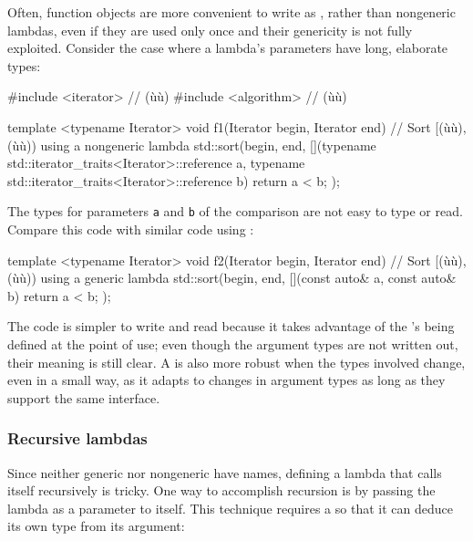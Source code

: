 {Often, function objects are more convenient to write as , rather than nongeneric lambdas, even if they are used only
once and their genericity is not fully exploited. Consider the case
where a lambda's parameters have long, elaborate types:

\begin{emcppslisting}
#include <iterator>   // (ù{}ù)
#include <algorithm>  // (ù{}ù)

template <typename Iterator>
void f1(Iterator begin, Iterator end)
    // Sort [(ù{}ù), (ù{}ù)) using a nongeneric lambda
{
    std::sort(begin, end,
              [](typename std::iterator_traits<Iterator>::reference a,
                 typename std::iterator_traits<Iterator>::reference b)
              {
                  return a < b;
              });
}
\end{emcppslisting}
    

\noindent The types for parameters \lstinline!a! and \lstinline!b! of the comparison
 are not easy to type or read. Compare this
code with similar code using :

\begin{emcppslisting}
template <typename Iterator>
void f2(Iterator begin, Iterator end)
    // Sort [(ù{}ù), (ù{}ù)) using a generic lambda
{
    std::sort(begin, end,
              [](const auto& a, const auto& b) { return a < b; });
}
\end{emcppslisting}
    

\noindent The code is simpler to write and read because it takes advantage of the
's being defined at the point of use; even
though the argument types are not written out, their meaning is still
clear. A  is also more robust when the types
involved change, even in a small way, as it adapts to changes in
argument types as long as they support the same interface.

\subsubsection[Recursive lambdas]{Recursive lambdas}\label{recursive-lambdas}

Since neither generic nor nongeneric  have
names, defining a lambda that calls itself recursively is tricky. One
way to accomplish recursion is by passing the lambda as a parameter to
itself. This technique requires a  so that it can
deduce its own type from its argument:

}
